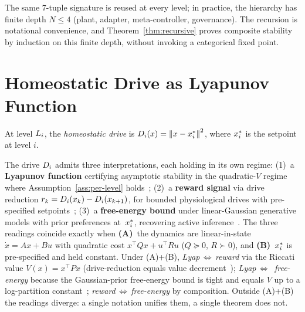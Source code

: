 \documentclass[conference]{IEEEtran}
\begin{document}
\begin{remark}
\label{rem:structural-self-similarity}
The same 7-tuple signature is reused at every level; in practice, the
hierarchy has finite depth $N \leq 4$ (plant, adapter, meta-controller,
governance).  The recursion is notational convenience, and
Theorem~\ref{thm:recursive} proves composite stability by induction on
this finite depth, without invoking a categorical fixed point.
\end{remark}

\section{Homeostatic Drive as Lyapunov Function}
\label{sec:drive}

\begin{definition}
\label{def:drive}
At level $L_{i}$, the \emph{homeostatic drive} is
$D_{i}(x) = \left\| x - x^*_{i} \right\|^2$,
where $x^*_{i}$ is the setpoint at level $i$.
\end{definition}

\begin{proposition}
\label{prop:triple}
The drive $D_{i}$ admits three interpretations, each holding in its
own regime:
(1)~a \textbf{Lyapunov function} certifying asymptotic stability in the
quadratic-$V$ regime where Assumption~\ref{ass:per-level}
holds~\cite{khalil2002nonlinear};
(2)~a \textbf{reward signal} via drive reduction
$r_k = D_{i}(x_k) - D_{i}(x_{k+1})$, for bounded physiological
drives with pre-specified setpoints~\cite{keramati2014homeostatic};
(3)~a \textbf{free-energy bound} under linear-Gaussian generative
models with prior preferences at~$x^*_{i}$, recovering active
inference~\cite{baltieri2019pid,friston2009reinforcement}.
The three readings coincide exactly when \textbf{(A)}~the dynamics
are linear-in-state $\dot{x} = Ax + Bu$ with quadratic cost
$x^\top Q x + u^\top R u$ ($Q \succeq 0$, $R \succ 0$), and
\textbf{(B)}~$x^*_{i}$ is pre-specified and held constant.
Under (A)+(B), \emph{Lyap\,$\Leftrightarrow$\,reward} via the Riccati
value $V(x) = x^\top P x$ (drive-reduction equals value
decrement~\cite{khalil2002nonlinear}); \emph{Lyap\,$\Leftrightarrow$\,
free-energy} because the Gaussian-prior free-energy bound is tight
and equals $V$ up to a log-partition constant~\cite{baltieri2019pid};
\emph{reward\,$\Leftrightarrow$\,free-energy} by composition.  Outside
(A)+(B) the readings diverge: a single notation unifies them, a
single theorem does not.
\end{proposition}
\end{document}
